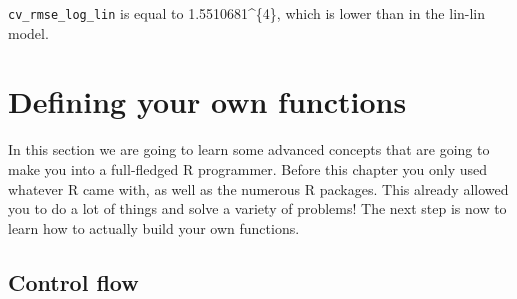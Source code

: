 \documentclass[]{gitbook}
\newenvironment{Shaded}{\begin{snugshade}}{\end{snugshade}}
\newcommand{\DataTypeTok}[1]{\textcolor[rgb]{0.13,0.29,0.53}{#1}}
\newcommand{\DecValTok}[1]{\textcolor[rgb]{0.00,0.00,0.81}{#1}}
\newcommand{\KeywordTok}[1]{\textcolor[rgb]{0.13,0.29,0.53}{\textbf{#1}}}
\newcommand{\NormalTok}[1]{#1}
\newcommand{\OperatorTok}[1]{\textcolor[rgb]{0.81,0.36,0.00}{\textbf{#1}}}
\newcommand{\OtherTok}[1]{\textcolor[rgb]{0.56,0.35,0.01}{#1}}
\newcommand{\StringTok}[1]{\textcolor[rgb]{0.31,0.60,0.02}{#1}}
\theoremstyle{definition}
\theoremstyle{definition}
\theoremstyle{definition}
\theoremstyle{remark}
\begin{document}
\begin{Shaded}
\end{Shaded}

\texttt{cv\_rmse\_log\_lin} is equal to 1.5510681\^{}\{4\},
which is lower than in the lin-lin model.

\hypertarget{defining-your-own-functions}{%
\section{Defining your own
functions}\label{defining-your-own-functions}}

In this section we are going to learn some advanced concepts that are
going to make you into a full-fledged R programmer. Before this chapter
you only used whatever R came with, as well as the numerous R packages.
This already allowed you to do a lot of things and solve a variety of
problems! The next step is now to learn how to actually build your own
functions.

\hypertarget{control-flow}{%
\subsection{Control flow}\label{control-flow}}
\end{document}
